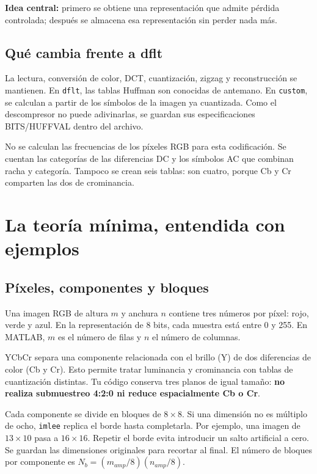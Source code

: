 \documentclass[11pt,a4paper,oneside]{report}
\begin{document}
\textbf{Idea central:} primero se obtiene una representación que admite
pérdida controlada; después se almacena esa representación sin perder nada más.


\section{Qué cambia frente a dflt}

La lectura, conversión de color, DCT, cuantización, zigzag y reconstrucción
se mantienen. En \texttt{dflt}, las tablas Huffman son conocidas de antemano.
En \texttt{custom}, se calculan a partir de los símbolos de la imagen
ya cuantizada. Como el descompresor no puede adivinarlas, se guardan sus
especificaciones BITS/HUFFVAL dentro del archivo.

No se calculan las frecuencias de los píxeles RGB para esta codificación.
Se cuentan las categorías de las diferencias DC y los símbolos AC que
combinan racha y categoría. Tampoco se crean seis tablas: son cuatro,
porque Cb y Cr comparten las dos de crominancia.


\chapter{La teoría mínima, entendida con ejemplos}
\section{Píxeles, componentes y bloques}

Una imagen RGB de altura $m$ y anchura $n$ contiene tres números por píxel:
rojo, verde y azul. En la representación de 8 bits, cada muestra está entre
0 y 255. En MATLAB, $m$ es el número de filas y $n$ el número de columnas.

YCbCr separa una componente relacionada con el brillo (Y) de dos diferencias
de color (Cb y Cr). Esto permite tratar luminancia y crominancia con tablas
de cuantización distintas. Tu código conserva tres planos de igual tamaño:
\textbf{no realiza submuestreo 4:2:0 ni reduce espacialmente Cb o Cr}.

Cada componente se divide en bloques de $8\times8$. Si una dimensión no es
múltiplo de ocho, \texttt{imlee} replica el borde hasta completarla. Por ejemplo,
una imagen de $13\times10$ pasa a $16\times16$. Repetir el borde evita introducir
un salto artificial a cero. Se guardan las dimensiones originales para recortar
al final. El número de bloques por componente es
$N_b=(m_{amp}/8)(n_{amp}/8)$.
\end{document}
